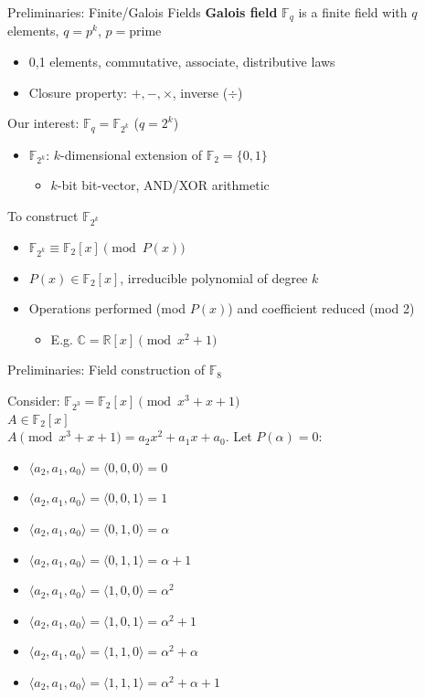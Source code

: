 \documentclass[xcolor=dvipsnames]{beamer}
\newcommand{\Fkk}{{\mathbb{F}}_{2^k}}
\newcommand{\bi}{\begin{itemize}}
\newcommand{\ei}{\end{itemize}}
\newcommand{\C}{{\mathbb{C}}}
\newcommand{\R}{{\mathbb{R}}}
\begin{document}
\begin{frame}{\large{Preliminaries: Finite/Galois Fields}}
\textbf {Galois field} $\mathbb{F}_q$ is a finite field with $q$
elements, $q = p^k$, $p = $prime
\begin{itemize}
\item 0,1 elements, commutative, associate, distributive laws
\item Closure property: $+,-,\times$, inverse ($\div$)
\end{itemize}


Our interest: $\mathbb{F}_{q} = \Fkk$ ($q = 2^k$)
\begin{itemize}
\item  $\mathbb{F}_{2^k}$: $k$-dimensional extension of  $\mathbb{F}_{2}=\{0,1\}$
	\begin{itemize}
	\item $k$-bit bit-vector, AND/XOR arithmetic
	\end{itemize}
\end{itemize}

To construct $\mathbb{F}_{2^k}$
\begin{itemize}
\item $\mathbb{F}_{2^k} \equiv \mathbb{F}_{2}[x] \pmod {P(x)}$
\item $P(x) \in \mathbb{F}_{2}[x]$, irreducible polynomial of degree
  $k$
\item Operations performed (mod $P(x)$) and coefficient reduced (mod 2)
\bi
\item E.g. $\C   = \R[x] \pmod{ x^2+1}$
\ei
\end{itemize}
\end{frame}
\begin{frame}{Preliminaries: Field construction of $\mathbb{F}_8$}

Consider: $\mathbb{F}_{2^3}= \mathbb{F}_{2}[x] \pmod {x^3 + x +
  1}$\\ $A \in \mathbb{F}_{2}[x]$ \\ 
$A \pmod {x^3 + x + 1} = a_2 x^2 + a_1 x + a_0$. Let $P(\alpha) = 0$:

\begin{itemize}
\item $\langle a_2, a_1, a_0 \rangle = \langle 0, 0, 0\rangle = 0$
\item $\langle a_2, a_1, a_0 \rangle = \langle 0, 0, 1\rangle = 1$
\item $\langle a_2, a_1, a_0 \rangle = \langle 0, 1, 0\rangle = \alpha$
\item $\langle a_2, a_1, a_0 \rangle = \langle 0, 1, 1\rangle = \alpha
  + 1$
\item $\langle a_2, a_1, a_0 \rangle = \langle 1, 0, 0\rangle = \alpha^2$
\item $\langle a_2, a_1, a_0 \rangle = \langle 1, 0, 1\rangle =
  \alpha^2 + 1$
\item $\langle a_2, a_1, a_0 \rangle = \langle 1, 1, 0\rangle =
  \alpha^2 + \alpha$
\item $\langle a_2, a_1, a_0 \rangle = \langle 1, 1, 1\rangle =
  \alpha^2 + \alpha + 1$
\end{itemize}
\end{frame}
\end{document}

